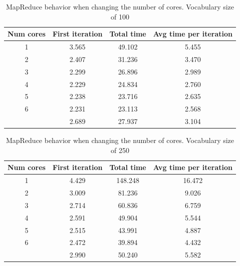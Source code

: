\begin{table}
	\caption{MapReduce behavior when changing the number of cores. Vocabulary size of 100}
    \begin{tabular}{c S[table-format=1.3] S[table-format=2.3] S[table-format=1.3]}
		\toprule
        {Num cores} & {First iteration} & {Total time} & {Avg time per iteration} \\
		         & 3.565           & 49.102     & 5.455                  \\
		2         & 2.407           & 31.236     & 3.470                  \\
		3         & 2.299           & 26.896     & 2.989                  \\
		4         & 2.229           & 24.834     & 2.760                  \\
		5         & 2.238           & 23.716     & 2.635                  \\
		6         & 2.231           & 23.113     & 2.568                  \\
                 & 2.689           & 27.937     & 3.104                  \\
        \bottomrule
	\end{tabular}
\end{table}

\begin{table}
	\caption{MapReduce behavior when changing the number of cores. Vocabulary size of 250}
    \begin{tabular}{c S[table-format=1.3] S[table-format=3.3] S[table-format=2.3]}
		\toprule
        {Num cores} & {First iteration} & {Total time} & {Avg time per iteration} \\
		         & 4.429           & 148.248    & 16.472                 \\
		2         & 3.009           & 81.236     & 9.026                  \\
		3         & 2.714           & 60.836     & 6.759                  \\
		4         & 2.591           & 49.904     & 5.544                  \\
		5         & 2.515           & 43.991     & 4.887                  \\
		6         & 2.472           & 39.894     & 4.432                  \\
                 & 2.990           & 50.240     & 5.582                  \\
		\bottomrule
	\end{tabular}
\end{table}


